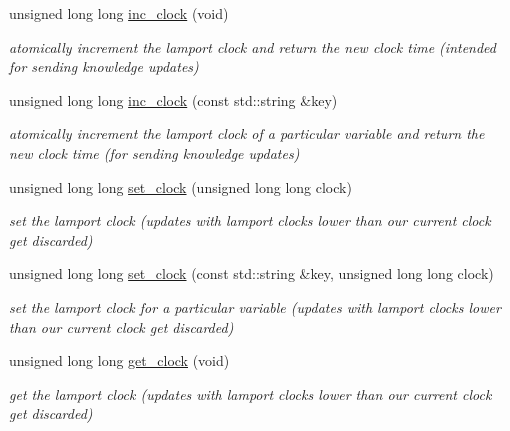 \begin{DoxyCompactItemize}
unsigned long long \hyperlink{classMadara_1_1Knowledge__Engine_1_1Thread__Safe__Context_a7a9faa4faee4c334c58ab359b8e1d870}{inc\_\-clock} (void)
\begin{DoxyCompactList}\small\item\em atomically increment the lamport clock and return the new clock time (intended for sending knowledge updates) \item\end{DoxyCompactList}\item 
unsigned long long \hyperlink{classMadara_1_1Knowledge__Engine_1_1Thread__Safe__Context_a7308e69ba47dabe9f1ba95d4091f91d3}{inc\_\-clock} (const std::string \&key)
\begin{DoxyCompactList}\small\item\em atomically increment the lamport clock of a particular variable and return the new clock time (for sending knowledge updates) \item\end{DoxyCompactList}\item 
unsigned long long \hyperlink{classMadara_1_1Knowledge__Engine_1_1Thread__Safe__Context_a9fedc92a1b9d47303612aabbb7515b84}{set\_\-clock} (unsigned long long clock)
\begin{DoxyCompactList}\small\item\em set the lamport clock (updates with lamport clocks lower than our current clock get discarded) \item\end{DoxyCompactList}\item 
unsigned long long \hyperlink{classMadara_1_1Knowledge__Engine_1_1Thread__Safe__Context_a4e161b678cad2b529bb30a66c35ba549}{set\_\-clock} (const std::string \&key, unsigned long long clock)
\begin{DoxyCompactList}\small\item\em set the lamport clock for a particular variable (updates with lamport clocks lower than our current clock get discarded) \item\end{DoxyCompactList}\item 
unsigned long long \hyperlink{classMadara_1_1Knowledge__Engine_1_1Thread__Safe__Context_af4caa12ac1e96723cea1a627e75355e8}{get\_\-clock} (void)
\begin{DoxyCompactList}\small\item\em get the lamport clock (updates with lamport clocks lower than our current clock get discarded) \item\end{DoxyCompactList}\item 

\end{DoxyCompactItemize}
